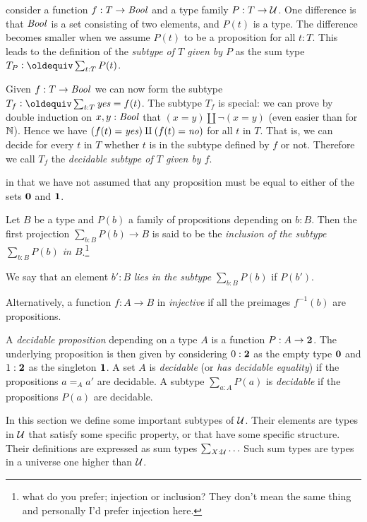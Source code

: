 consider a function $f:T\to\mathop{\mathit{Bool}}$
and a type family $P: T\to\mathcal{U}$. One difference is that $\mathop{\mathit{Bool}}$ is 
a set consisting of two elements, and $P(t)$ is a type.
The difference becomes smaller when we assume $P(t)$ to be a
proposition for all $t:T$. This leads to the definition of the 
\emph{subtype of $T$ given by $P$} as the sum type $T_P \defeq \sum_{t:T} P(t)$.

Given $f:T\to\mathop{\mathit{Bool}}$ we can now form the 
subtype $T_f \defeq \sum_{t:T} \yes = f(t)$.
The subtype $T_f$ is special: we can prove by
double induction on $x,y:\mathop{\mathit{Bool}}$ that $(x=y)\amalg\neg(x=y)$
(even easier than for $\mathbb{N}$). Hence we have
$(f(t) = \mathop{\mathit{yes}})\amalg(f(t) = \mathop{\mathit{no}})$ for all $t$ in $T$.
That is, we can decide for every $t$ in $T$ whether $t$ is in the
subtype defined by $f$ or not. Therefore we call $T_f$ the
\emph{decidable subtype of $T$ given by $f$}. 


in that we have not assumed that any proposition must be equal to either of the sets $\mathbf{0}$ and $\mathbf{1}$.  
\begin{definition}
  \label{def:subtype}
  Let $B$ be a type and $P(b)$ a family of propositions depending on $b:B$.  Then the first projection $\sum_{b:B}P(b)\to B$ is said to be the \emph{inclusion of the subtype $\sum_{b:B}P(b)$ in $B$}.\footnote{what do you prefer; injection or inclusion?  They don't mean the same thing and personally I'd prefer injection here.}  

We say that an element $b':B$ \emph{lies in the subtype} $\sum_{b:B}P(b)$ if $P(b')$.
\end{definition}

Alternatively, a function $f:A\to B$ in \emph{injective} if all the preimages $f^{-1}(b)$ are propositions.

\begin{definition}
  \label{def:decidableprop}
  A \emph{decidable proposition} depending on a type $A$ is a function $P:A\to\mathbf{2}$.  The underlying proposition is then given by considering $0:\mathbf{2}$ as the empty type $\mathbf{0}$ and $1:\mathbf{2}$ as the singleton $\mathbf{1}$.  A set $A$ is \emph{decidable} (or \emph{has decidable equality}) if the propositions $a=_Aa'$ are decidable.  A subtype $\sum_{a:A}P(a)$ is \emph{decidable} if the propositions $P(a)$ are decidable. 
\end{definition}


In this section we define some important subtypes of $\mathcal{U}$.
Their elements are types in $\mathcal{U}$ that satisfy some specific
property, or that have some specific structure. Their definitions
are expressed as sum types $\sum_{X:\mathcal{U}} \ldots$ Such sum types
are types in a universe one higher than $\mathcal{U}$.

